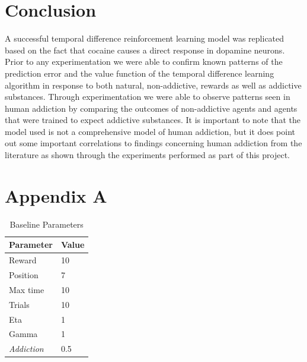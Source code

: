 \documentclass[10pt,letterpaper]{article}
\begin{document}
\vspace{5.5em}

\section{Conclusion}
A successful temporal difference reinforcement learning model was replicated \cite{ReddishJohnson2004} based on the fact that cocaine causes a direct response in dopamine neurons. Prior to any experimentation we were able to confirm known patterns of the prediction error and the value function of the temporal difference learning algorithm in response to both natural, non-addictive, rewards as well as addictive substances. Through experimentation we were able to observe patterns seen in human addiction by comparing the outcomes of non-addictive agents and agents that were trained to expect addictive substances. It is important to note that the model used is not a comprehensive model of human addiction, but it does point out some important correlations to findings concerning human addiction from the literature as shown through the experiments performed as part of this project.


\section{Appendix A}
\begin{table}[H]
\begin{center} 
\caption{Baseline Parameters} 
\label{baselineparams} 
\vskip 0.12in
\begin{tabular}{ll} 
\hline
Parameter    &  Value \\
\hline
Reward       &   10 \\
Position~~~  &   7 \\
Max time~~   &   10 \\
Trials~~     &   10 \\
Eta~~~~~~~   &   1 \\
Gamma~~~     &   1 \\
\emph{Addiction}~  &   0.5 \\
\hline
\end{tabular} 
\end{center} 
\end{table}
\end{document}
